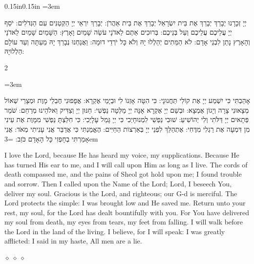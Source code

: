 \documentclass[11pt, openany]{book}
\newenvironment{hebrewblock}{%
  \par\vspace{4pt}
  \begin{adjustwidth}{0.15in}{0.15in}
  \begingroup
  \RTL
  \hebrewfont\large
  \setstretch{1.4}
  \emergencystretch=3em
  \tolerance=9999
  \parindent=0pt\relax
}{%
  \endRTL
  \endgroup
  \end{adjustwidth}
  \par\vspace{2pt}
}
\newcommand{\sederdivider}{%
  \par\vspace{6pt}
  \begin{center}
    \textcolor{sedergold}{\pgfornament[width=1.5cm]{11}}
  \end{center}
  \par\vspace{6pt}
}
\newenvironment{bilingual}{%
  \par\vspace{4pt}%
  \begin{paracol}{2}%
}{%
  \end{paracol}%
  \par\vspace{2pt}%
}
\newenvironment{hebrewcol}{%
  \switchcolumn[1]%
  \begingroup
  \RTL
  \hebrewfont\large
  \setstretch{1.4}%
  \emergencystretch=3em
  \tolerance=9999
  \parindent=0pt\relax
}{%
  \endRTL
  \endgroup
}
\newenvironment{englishcol}{%
  \switchcolumn[0]%
  \begingroup
  \setstretch{1.4}%
  \emergencystretch=3em
  \tolerance=9999
  \normalsize
  \rightskip=0.12in\relax
}{%
  \endgroup
}
\newcommand{\parasep}{%
  \par\vspace{3pt}
  \begin{center}
    \textcolor{sedergold!50}{\tiny$\diamond\;\diamond\;\diamond$}
  \end{center}
  \par\vspace{3pt}
}
\begin{document}
\begin{hebrewblock}
יְיָ זְכָרָנוּ יְבָרֵךְ יְבָרֵךְ אֶת בֵּית יִשְׂרָאֵל יְבָרֵךְ אֶת בֵּית אַהֲרֹן: יְבָרֵךְ יִרְאֵי יְיָ הַקְּטַנִּים עִם הַגְּדֹלִים: יֹסֵף יְיָ עֲלֵיכֶם עֲלֵיכֶם וְעַל בְּנֵיכֶם: בְּרוּכִים אַתֶּם לַאדֹנָי עֹשֵׂה שָׁמַיִם וָאָרֶץ: הַשָּׁמַיִם שָׁמַיִם לַאדֹנָי וְהָאָרֶץ נָתַן לִבְנֵי אָדָם: לֹא הַמֵּתִים יְהַלְלוּ יָהּ וְלֹא כָּל יֹרְדֵי דוּמָה: וַאֲנַחְנוּ נְבָרֵךְ יָהּ מֵעַתָּה וְעַד עוֹלָם הַלְלוּיָהּ:
\end{hebrewblock}

\sederdivider

\begin{bilingual}
\begin{hebrewcol}
אָהַבְתִּי כִּי יִשְׁמַע יְיָ אֶת קוֹלִי תַּחֲנוּנָי: כִּי הִטָּה אָזְנוֹ לִי וּבְיָמַי אֶקְרָא: אֲפָפוּנִי חֶבְלֵי מָוֶת וּמְצָרֵי שְׁאוֹל מְצָאוּנִי צָרָה וְיָגוֹן אֶמְצָא: וּבְשֵׁם יְיָ אֶקְרָא אָנָּה יְיָ מַלְּטָה נַפְשִׁי: חַנּוּן יְיָ וְצַדִּיק וֵאלֹהֵינוּ מְרַחֵם: שֹׁמֵר פְּתָאיִם יְיָ דַּלֹּתִי וְלִי יְהוֹשִׁיעַ: שׁוּבִי נַפְשִׁי לִמְנוּחָיְכִי כִּי יְיָ גָּמַל עָלָיְכִי: כִּי חִלַּצְתָּ נַפְשִׁי מִמָּוֶת אֶת עֵינִי מִן דִּמְעָה אֶת רַגְלִי מִדֶּחִי: אֶתְהַלֵּךְ לִפְנֵי יְיָ בְּאַרְצוֹת הַחַיִּים: הֶאֱמַנְתִּי כִּי אֲדַבֵּר אֲנִי עָנִיתִי מְאֹד: אֲנִי אָמַרְתִּי בְחָפְזִי כָּל הָאָדָם כֹּזֵב:
\end{hebrewcol}
\begin{englishcol}
I love the Lord, because He has heard my voice, my supplications. Because He has turned His ear to me, and I will  call upon Him as long as I live. The cords of death compassed me, and the pains of Sheol got hold upon me; I found trouble and sorrow. Then I called upon the Name of the Lord; Lord, I beseech You, deliver my soul. Gracious is the Lord, and righteous; our G-d is merciful. The Lord protects the simple: I was brought low and He saved me. Return unto your rest, my soul, for the Lord has dealt bountifully with you. For You have delivered my soul from death, my eyes from tears, my feet from falling. I will walk before the Lord in the land of the living. I believe, for I will speak: I was greatly afflicted: I said in my haste, All men are a lie.
\end{englishcol}
\end{bilingual}
\parasep
\end{document}
